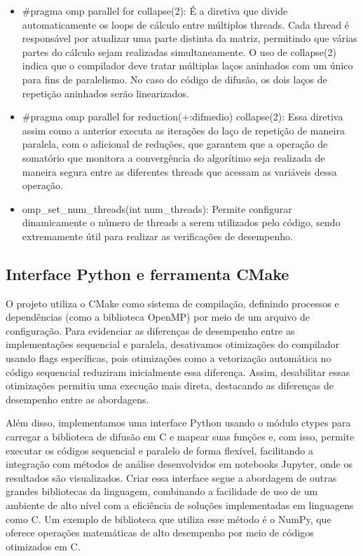 \documentclass[12pt]{article}
\begin{document}
\begin{itemize}
  \item \#pragma omp parallel for collapse(2): É a diretiva que divide
        automaticamente os loops de cálculo entre múltiplos threads. Cada thread é
        responsável por atualizar uma parte distinta da matriz, permitindo que várias
        partes do cálculo sejam realizadas simultaneamente. O uso de collapse(2) indica
        que o compilador deve tratar múltiplas laços aninhados com um único para fins
        de paralelismo. No caso do código de difusão, os dois laços de repetição
        aninhados serão linearizados.
  \item \#pragma omp parallel for reduction(+:difmedio) collapse(2): Essa
        diretiva assim como a anterior executa as iterações do laço de repetição de
        maneira paralela, com o adicional de reduções, que garantem que a operação de
        somatório que monitora a convergência do algorítimo seja realizada de maneira
        segura entre as diferentes threads que acessam as variáveis dessa operação.
  \item omp\_set\_num\_threads(int num\_threads): Permite configurar
        dinamicamente o número de threads a serem utilizados pelo código, sendo
        extremamente útil para realizar as verificações de desempenho.
\end{itemize}

\subsection{Interface Python e ferramenta CMake}

O projeto utiliza o CMake como sistema de compilação, definindo processos e
dependências (como a biblioteca OpenMP) por meio de um arquivo de configuração.
Para evidenciar as diferenças de desempenho entre as implementações sequencial
e paralela, desativamos otimizações do compilador usando flags específicas,
pois otimizações como a vetorização automática no código sequencial reduziram
inicialmente essa diferença. Assim, desabilitar essas otimizações permitiu uma
execução mais direta, destacando as diferenças de desempenho entre as
abordagens.

Além disso, implementamos uma interface Python usando o módulo ctypes para
carregar a biblioteca de difusão em C e mapear suas funções e, com isso,
permite executar os códigos sequencial e paralelo de forma flexível,
facilitando a integração com métodos de análise desenvolvidos em notebooks
Jupyter, onde os resultados são visualizados. Criar essa interface segue a
abordagem de outras grandes bibliotecas da linguagem, combinando a facilidade
de uso de um ambiente de alto nível com a eficiência de soluções implementadas
em linguagens como C. Um exemplo de biblioteca que utiliza esse método é o
NumPy, que oferece operações matemáticas de alto desempenho por meio de códigos
otimizados em C.
\end{document}
